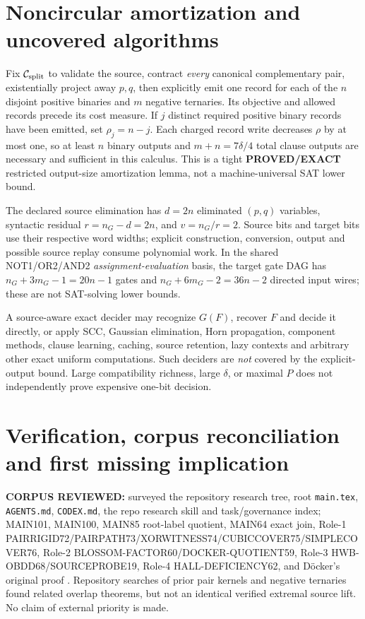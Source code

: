 \documentclass[11pt]{article}
\begin{document}
\section{Noncircular amortization and uncovered algorithms}
Fix $\mathcal C_{\rm split}$ to validate the source, contract \emph{every} canonical complementary pair, existentially project away $p,q$, then explicitly emit one record for each of the $n$ disjoint positive binaries and $m$ negative ternaries. Its objective and allowed records precede its cost measure. If $j$ distinct required positive binary records have been emitted, set $\rho_j=n-j$. Each charged record write decreases $\rho$ by at most one, so at least $n$ binary outputs and $m+n=7\delta/4$ total clause outputs are necessary and sufficient in this calculus. This is a tight \textbf{PROVED/EXACT} restricted output-size amortization lemma, not a machine-universal SAT lower bound.

The declared source elimination has $d=2n$ eliminated $(p,q)$ variables, syntactic residual $r=n_G-d=2n$, and $v=n_G/r=2$. Source bits and target bits use their respective word widths; explicit construction, conversion, output and possible source replay consume polynomial work. In the shared NOT1/OR2/AND2 \emph{assignment-evaluation} basis, the target gate DAG has $n_G+3m_G-1=20n-1$ gates and $n_G+6m_G-2=36n-2$ directed input wires; these are not SAT-solving lower bounds.

A source-aware exact decider may recognize $G(F)$, recover $F$ and decide it directly, or apply SCC, Gaussian elimination, Horn propagation, component methods, clause learning, caching, source retention, lazy contexts and arbitrary other exact uniform computations. Such deciders are \emph{not} covered by the explicit-output bound. Large compatibility richness, large $\delta$, or maximal $P$ does not independently prove expensive one-bit decision.

\section{Verification, corpus reconciliation and first missing implication}
\textbf{CORPUS REVIEWED:} surveyed the repository research tree, root \texttt{main.tex}, \texttt{AGENTS.md}, \texttt{CODEX.md}, the repo research skill and task/governance index; MAIN101, MAIN100, MAIN85 root-label quotient, MAIN64 exact join, Role-1 PAIRRIGID72/PAIRPATH73/XORWITNESS74/CUBICCOVER75/SIMPLECOVER76, Role-2 BLOSSOM-FACTOR60/DOCKER-QUOTIENT59, Role-3 HWB-OBDD68/SOURCEPROBE19, Role-4 HALL-DEFICIENCY62, and D\"ocker's original proof \cite{docker}. Repository searches of prior pair kernels and negative ternaries found related overlap theorems, but not an identical verified extremal source lift. No claim of external priority is made.
\end{document}
